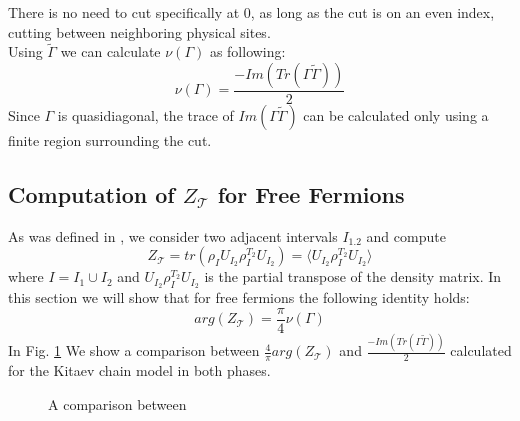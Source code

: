 \documentclass[%
 reprint,
 amsmath,amssymb,
 aps,
]{revtex4-2}
\begin{document}
There is no need to cut specifically at $0$, as long as the cut is on an even index, cutting between neighboring physical sites. \\
Using $\tilde\Gamma$ we can calculate $\nu(\Gamma)$ as following:
\begin{equation}
    \nu(\Gamma) = \frac{-Im\left(Tr(\Gamma\tilde\Gamma)\right)}{2}
\end{equation}
Since $\Gamma$ is quasidiagonal, the trace of $Im(\Gamma\tilde\Gamma)$ can be calculated only using a finite region surrounding the cut.

\subsection{Computation of $Z_\mathcal{T}$ for Free Fermions}
As was defined in \cite{shap2017}, we consider two adjacent intervals $I_{1.2}$ and compute
\begin{equation}
    Z_{\mathcal{T}}=tr(\rho_IU_{I_2}\rho_I^{T_2}U_{I_2})=\langle U_{I_2}\rho_I^{T_2}U_{I_2} \rangle
\end{equation}
where $I=I_1\cup I_2$ and $U_{I_2}\rho_I^{T_2}U_{I_2}$ is the partial transpose of the density matrix. In this section we will show that for free fermions the following identity holds:
\begin{equation}
    arg(Z_{\mathcal{T}}) = \frac{\pi}{4}\nu(\Gamma)
\end{equation}
In Fig. \ref{fig:bdi index comparison} We show a comparison between $\frac{4}{\pi}arg(Z_{\mathcal{T}})$ and $\frac{-Im\left(Tr(\Gamma\tilde\Gamma)\right)}{2}$ calculated for the Kitaev chain model in both phases.

\begin{figure}[h]
\centering

\caption{\label{fig:bdi index comparison} A comparison between}
\end{figure}
\end{document}
